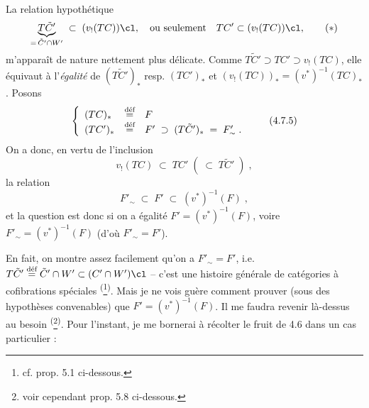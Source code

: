 La relation hypothétique
\[
\underbrace{T\tilde{C}'}_{=\,\tilde{C}'\cap W'} \;\subset\; (v_{!}(TC))\cl, \quad \text{ou seulement} \quad TC' \subset (v_{!}(TC))\cl,
\tag*{$(*)$}
\]
m'apparaît de nature nettement plus délicate. Comme $T\tilde{C}' \supset TC' \supset v_{!}(TC)$, elle équivaut à l'\textit{égalité} de $(T\tilde{C}')_{*}$ resp. $(TC')_{*}$ et $(v_{!}(TC))_{*} = (v^{*})^{-1}(TC)_{*}$. Posons
\[
\left\{
\begin{array}{lcl}
(TC)_{*} & \defeq & F \\
(TC')_{*} & \defeq & F' \;\supset\; (T\tilde{C}')_{*} \;=\; F'_{\sim} \; .
\end{array}
\right.
\tag*{(4.7.5)}
\]
On a donc, en vertu de l'inclusion
\[
v_{!}(TC) \;\subset\; TC' \; ( \;\subset\; T\tilde{C}' \; ) \; ,
\]
la relation
\[
F'_{\sim} \;\subset\; F' \;\subset\; (v^{*})^{-1}(F) \; ,
\tag*{(4.7.6)}
\]
et la question est donc si on a égalité $F' = (v^{*})^{-1}(F)$, voire $F'_{\sim} = (v^{*})^{-1}(F)$ (d'où $F'_{\sim} = F'$).


En fait, on montre assez facilement qu'on a $F'_{\sim} = F'$, i.e. $T\tilde{C}' \defeq \tilde{C}' \cap W' \subset (C' \cap W')\cl$ -- c'est une histoire générale de catégories à cofibrations spéciales \textsuperscript{(}\footnote[21]{cf. prop. 5.1 ci-dessous.}\textsuperscript{)}. Mais je ne vois guère comment prouver (sous des hypothèses convenables) que $F' = (v^{*})^{-1}(F)$. Il me faudra revenir là-dessus au besoin \textsuperscript{(}\footnote[22]{voir cependant prop. 5.8 ci-dessous.}\textsuperscript{)}. Pour l'instant, je me bornerai à récolter le fruit de 4.6 dans un cas particulier :

